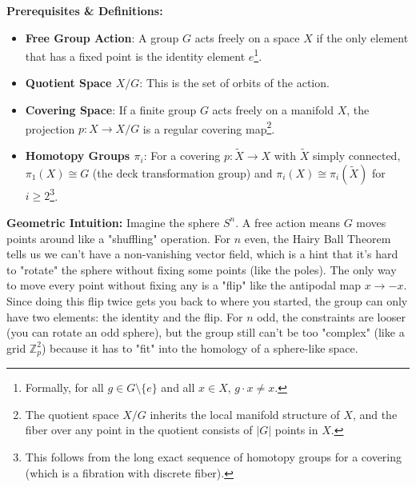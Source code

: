 \begin{solution}
\textbf{Prerequisites \& Definitions:}
\begin{itemize}
    \item \textbf{Free Group Action}: A group $G$ acts freely on a space $X$ if the only element that has a fixed point is the identity element $e$\footnote{Formally, for all $g \in G \setminus \{e\}$ and all $x \in X$, $g \cdot x \neq x$.}.
    \item \textbf{Quotient Space $X/G$}: This is the set of orbits of the action.
    \item \textbf{Covering Space}: If a finite group $G$ acts freely on a manifold $X$, the projection $p: X \to X/G$ is a regular covering map\footnote{The quotient space $X/G$ inherits the local manifold structure of $X$, and the fiber over any point in the quotient consists of $|G|$ points in $X$.}.
    \item \textbf{Homotopy Groups $\pi_i$}: For a covering $p: \tilde{X} \to X$ with $\tilde{X}$ simply connected, $\pi_1(X) \cong G$ (the deck transformation group) and $\pi_i(X) \cong \pi_i(\tilde{X})$ for $i \ge 2$\footnote{This follows from the long exact sequence of homotopy groups for a covering (which is a fibration with discrete fiber).}.
\end{itemize}

\textbf{Geometric Intuition:}
Imagine the sphere $S^n$. A free action means $G$ moves points around like a "shuffling" operation. For $n$ even, the Hairy Ball Theorem tells us we can't have a non-vanishing vector field, which is a hint that it's hard to "rotate" the sphere without fixing some points (like the poles). The only way to move every point without fixing any is a "flip" like the antipodal map $x \to -x$. Since doing this flip twice gets you back to where you started, the group can only have two elements: the identity and the flip. For $n$ odd, the constraints are looser (you can rotate an odd sphere), but the group still can't be too "complex" (like a grid $\mathbb{Z}_p^2$) because it has to "fit" into the homology of a sphere-like space.


\end{solution}
